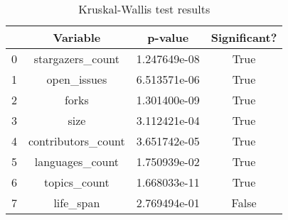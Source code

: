 \begin{table}
\centering
\caption{Kruskal-Wallis test results}
\label{tab:kruskal_wallis}
\begin{tabular}{lccc}
\toprule
{} &            Variable &       p-value &  Significant? \\
\midrule
0 &    stargazers\_count &  1.247649e-08 &          True \\
1 &         open\_issues &  6.513571e-06 &          True \\
2 &               forks &  1.301400e-09 &          True \\
3 &                size &  3.112421e-04 &          True \\
4 &  contributors\_count &  3.651742e-05 &          True \\
5 &     languages\_count &  1.750939e-02 &          True \\
6 &        topics\_count &  1.668033e-11 &          True \\
7 &           life\_span &  2.769494e-01 &         False \\
\bottomrule
\end{tabular}
\end{table}
